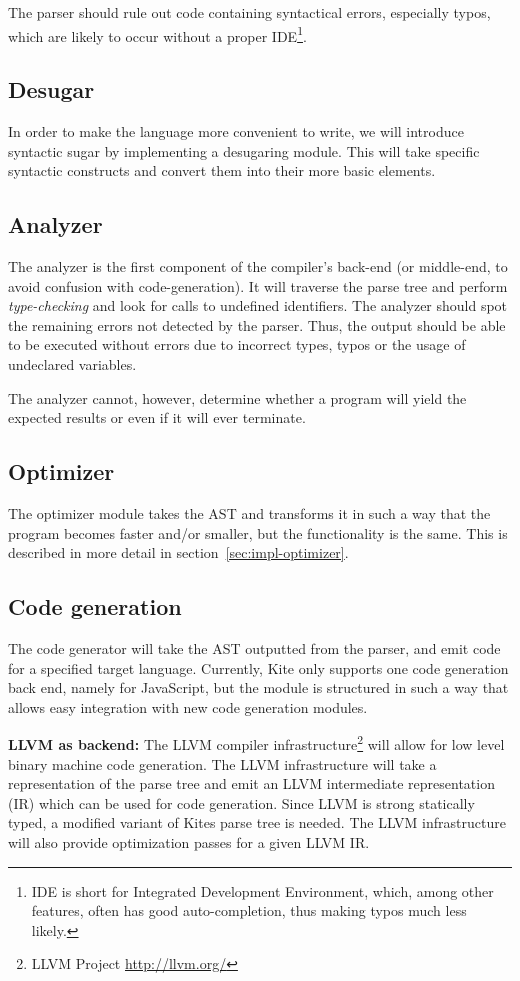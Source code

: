 The parser should rule out code containing syntactical errors, especially typos, which are likely to occur without a proper IDE\footnote{IDE is short for Integrated Development Environment, which, among other features, often has good auto-completion, thus making typos much less likely.}.


\subsection{Desugar}
In order to make the language more convenient to write, we will introduce syntactic sugar by implementing a desugaring module. This will take specific syntactic constructs and convert them into their more basic elements.


\subsection{Analyzer}
The analyzer is the first component of the compiler's back-end (or middle-end, to avoid confusion with code-generation). It will traverse the parse tree and perform \emph{type-checking} and look for calls to undefined identifiers. The analyzer should spot the remaining errors not detected by the parser. Thus, the output should be able to be executed without errors due to incorrect types, typos or the usage of undeclared variables.

The analyzer cannot, however, determine whether a program will yield the expected results or even if it will ever terminate.


\subsection{Optimizer}
The optimizer module takes the AST and transforms it in such a way that the program becomes faster and/or smaller, but the functionality is the same. This is described in more detail in section~\ref{sec:impl-optimizer}.


\subsection{Code generation}
The code generator will take the AST outputted from the parser, and emit code for a specified target language. Currently, Kite only supports one code generation back end, namely for JavaScript, but the module is structured in such a way that allows easy integration with new code generation modules.

\textbf{LLVM as backend:}
The LLVM compiler infrastructure\footnote{LLVM Project \url{http://llvm.org/}} will allow for low level binary machine code generation. The LLVM infrastructure will take a representation of the parse tree and emit an LLVM intermediate representation (IR) which can be used for code generation. Since LLVM is strong statically typed, a modified variant of Kites parse tree is needed. The LLVM infrastructure will also provide optimization passes for a given LLVM IR.

